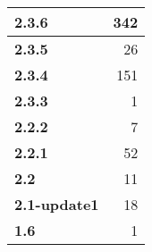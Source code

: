 \begin{table}[htbp]
\begin{tabular}{|l|r|}
\textbf{2.3.6} & 342 \\ \hline
\textbf{2.3.5} & 26 \\ \hline
\textbf{2.3.4} & 151 \\ \hline
\textbf{2.3.3} & 1 \\ \hline
\textbf{2.2.2} & 7 \\ \hline
\textbf{2.2.1} & 52 \\ \hline
\textbf{2.2} & 11 \\ \hline
\textbf{2.1-update1} & 18 \\ \hline
\textbf{1.6} & 1 \\ \hline
\end{tabular}
\label{}
\end{table}

